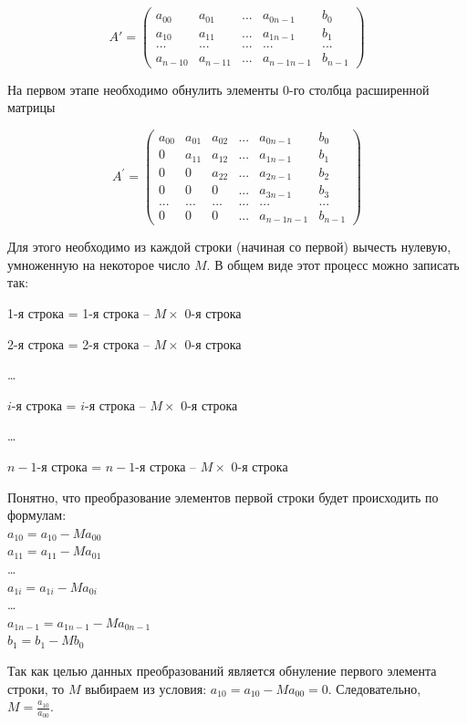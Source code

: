 \begin{equation}\label{gl06:prg1a}
A'=\left(\begin{matrix}
a_{00}&a_{01}&...&a_{0n-1}&b_0\\
a_{10}&a_{11}&...&a_{1n-1}&b_1\\
...&...&...&...&...\\
a_{n-10}&a_{n-11}&...&a_{n-1n-1}&b_{n-1}
\end{matrix}\right)
\end{equation}

На первом этапе необходимо обнулить элементы 0-го столбца расширенной матрицы 

\begin{equation}\label{gl06:prg2a}
A^{'}=\left(\begin{matrix}
a_{00}&a_{01}&a_{02}&...&a_{0n-1}&b_0\\
0&a_{11}&a_{12}&...&a_{1n-1}&b_1\\
0&0&a_{22}&...&a_{2n-1}&b_2\\
0&0&0&...&a_{3n-1}&b_3\\
...&...&...&...&...&...\\
0&0&0&...&a_{n-1n-1}&b_{n-1}
\end{matrix}\right)
\end{equation}

Для этого необходимо из каждой строки (начиная со первой) вычесть нулевую, умноженную на некоторое число $M$. В
общем виде этот процесс можно записать так:

1-я строка = 1-я строка -- $M\times$ 0-я строка

2-я строка = 2-я строка -- $M\times$ 0-я строка

…

$i$-я строка = $i$-я строка -- $M\times$ 0-я строка

…

$n-1$-я строка = $n-1$-я строка -- $M\times$ 0-я строка

Понятно, что преобразование элементов первой строки будет происходить по формулам:\\
$a_{10}=a_{10}-Ma_{00}$ \\
$a_{11}=a_{11}-Ma_{01}$\\
 …  \\
$a_{1i}=a_{1i}-Ma_{0i}$\\
 … \\
$a_{1n-1}=a_{1n-1}-Ma_{0n-1}$\\
$b_1=b_1-Mb_0$ 

Так как целью данных преобразований является обнуление первого элемента строки, то $M$ выбираем из условия: 
$a_{10}=a_{10}-Ma_{00}=0$. Следовательно,  $M=\frac{a_{10}}{a_{00}}$.

